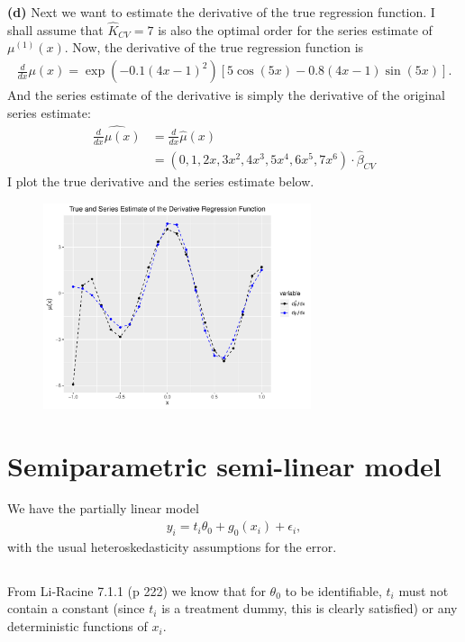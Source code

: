 \documentclass[12pt]{article}
\newcommand{\e}{\epsilon}
\newcommand{\mtx}[1]{\ensuremath{\bm{\mathit{#1}}}}
\begin{document}
\textbf{(d)} Next we want to estimate the derivative of the true regression function. I shall assume that $\hat K_{CV}=7$ is also the optimal order for the series estimate of $\mu^{(1)}(x)$. Now, the derivative of the true regression function is
\begin{align*}
\frac{d}{dx}\mu(x) = \exp(-0.1(4x-1)^2)\left[5 \cos(5x) - 0.8 (4x-1)\sin(5x)\right].
\end{align*}
And the series estimate of the derivative is simply the derivative of the original series estimate:
\begin{align*}
\widehat{\frac{d}{dx}\mu(x)}&=\frac{d}{dx}\hat \mu(x)\\
&=(0,1,2x,3x^2,4x^3,5x^4,6x^5,7x^6) \cdot \hat{\beta}_{CV}
\end{align*}
I plot the true derivative and the series estimate below.

\begin{figure}[h!]
    \centering
    
        \includegraphics[width=0.7\textwidth]{Q2_diagder.pdf}
\end{figure}



\newpage

\section{Semiparametric semi-linear model}
We have the partially linear model
\begin{align}
y_i = t_i \theta_0 + g_0(\mtx{x_i}) + \e_i, \label{eq:3a}
\end{align}
with the usual heteroskedasticity assumptions for the error.
\subsection{}
From Li-Racine 7.1.1 (p 222) we know that for $\theta_0$ to be identifiable, $t_i$ must not contain a constant (since $t_i$ is a treatment dummy, this is clearly satisfied) or any deterministic functions of $\mtx{x}_i$. 
\end{document}
